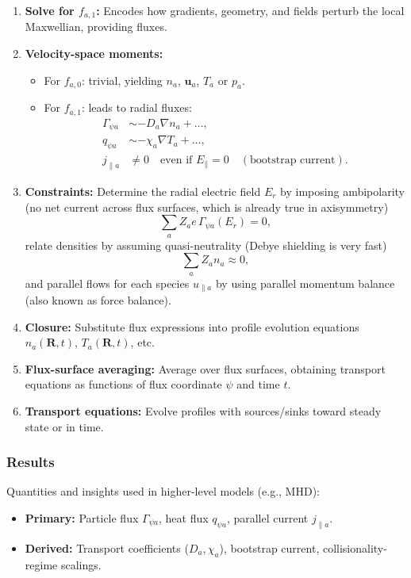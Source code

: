 \documentclass[10pt]{book}
\begin{document}
\begin{enumerate}
  \item \textbf{Solve for $f_{a,1}$:} Encodes how gradients, geometry, and fields perturb the local Maxwellian, providing fluxes.

  \item \textbf{Velocity-space moments:}
  \begin{itemize}
    \item For $f_{a,0}$: trivial, yielding $n_a$, $\mathbf{u}_a$, $T_a$ or $p_a$.
    \item For $f_{a,1}$: leads to radial fluxes:
    \begin{align}
        \Gamma_{\psi a} &\sim - D_a \nabla n_a + \dots, \\
        q_{\psi a} &\sim - \chi_a \nabla T_a + \dots, \\
        j_{\parallel a} &\neq 0 \quad \text{even if } E_\parallel = 0 \quad (\text{bootstrap current}).
    \end{align} 
  \end{itemize}

  \item \textbf{Constraints:} Determine the radial electric field $E_r$ by imposing ambipolarity (no net current across flux surfaces, which is already true in axisymmetry)
  \begin{equation}
    \sum_a Z_a e \, \Gamma_{\psi a}(E_r) = 0,
  \end{equation}
  relate densities by assuming quasi-neutrality (Debye shielding is very fast)
  \begin{equation}
    \sum_a Z_a n_a \approx 0,
  \end{equation}
  and parallel flows for each species $u_{\parallel a}$ by using parallel momentum balance (also known as force balance).

  \item \textbf{Closure:} Substitute flux expressions into profile evolution equations $n_a(\mathbf{R},t)$, $T_a(\mathbf{R},t)$, etc.

  \item \textbf{Flux-surface averaging:} Average over flux surfaces, obtaining transport equations as functions of flux coordinate $\psi$ and time $t$.

  \item \textbf{Transport equations:} Evolve profiles with sources/sinks toward steady state or in time.

\end{enumerate}

\subsubsection{Results}
Quantities and insights used in higher-level models (e.g., MHD):
  \begin{itemize}
    \item \textbf{Primary:} Particle flux $\Gamma_{\psi a}$, heat flux $q_{\psi a}$, parallel current $j_{\parallel a}$. 
    \item \textbf{Derived:} Transport coefficients ($D_a, \chi_a$), bootstrap current, collisionality-regime scalings. 
  \end{itemize}
\end{document}
